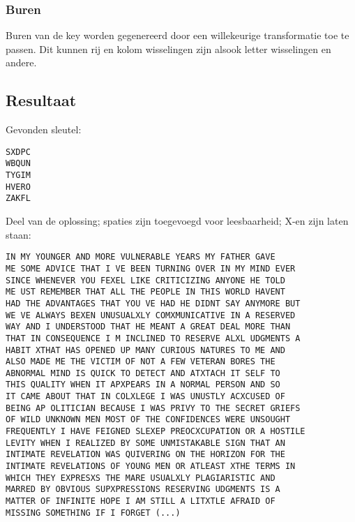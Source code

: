 \documentclass{article}
\begin{document}
\subsubsection{Buren}
Buren van de key worden gegenereerd door een willekeurige transformatie toe te passen. Dit kunnen rij en kolom wisselingen zijn alsook letter wisselingen en andere. 

\subsection{Resultaat}
Gevonden sleutel:
\begin{verbatim}
SXDPC
WBQUN
TYGIM
HVERO
ZAKFL
\end{verbatim}

Deel van de oplossing; spaties zijn toegevoegd voor leesbaarheid; X-en zijn laten staan:
\begin{verbatim}
IN MY YOUNGER AND MORE VULNERABLE YEARS MY FATHER GAVE
ME SOME ADVICE THAT I VE BEEN TURNING OVER IN MY MIND EVER
SINCE WHENEVER YOU FEXEL LIKE CRITICIZING ANYONE HE TOLD
ME UST REMEMBER THAT ALL THE PEOPLE IN THIS WORLD HAVENT
HAD THE ADVANTAGES THAT YOU VE HAD HE DIDNT SAY ANYMORE BUT
WE VE ALWAYS BEXEN UNUSUALXLY COMXMUNICATIVE IN A RESERVED
WAY AND I UNDERSTOOD THAT HE MEANT A GREAT DEAL MORE THAN
THAT IN CONSEQUENCE I M INCLINED TO RESERVE ALXL UDGMENTS A
HABIT XTHAT HAS OPENED UP MANY CURIOUS NATURES TO ME AND
ALSO MADE ME THE VICTIM OF NOT A FEW VETERAN BORES THE
ABNORMAL MIND IS QUICK TO DETECT AND ATXTACH IT SELF TO
THIS QUALITY WHEN IT APXPEARS IN A NORMAL PERSON AND SO
IT CAME ABOUT THAT IN COLXLEGE I WAS UNUSTLY ACXCUSED OF
BEING AP OLITICIAN BECAUSE I WAS PRIVY TO THE SECRET GRIEFS
OF WILD UNKNOWN MEN MOST OF THE CONFIDENCES WERE UNSOUGHT
FREQUENTLY I HAVE FEIGNED SLEXEP PREOCXCUPATION OR A HOSTILE
LEVITY WHEN I REALIZED BY SOME UNMISTAKABLE SIGN THAT AN
INTIMATE REVELATION WAS QUIVERING ON THE HORIZON FOR THE
INTIMATE REVELATIONS OF YOUNG MEN OR ATLEAST XTHE TERMS IN
WHICH THEY EXPRESXS THE MARE USUALXLY PLAGIARISTIC AND
MARRED BY OBVIOUS SUPXPRESSIONS RESERVING UDGMENTS IS A
MATTER OF INFINITE HOPE I AM STILL A LITXTLE AFRAID OF
MISSING SOMETHING IF I FORGET (...)
\end{verbatim}
\end{document}
